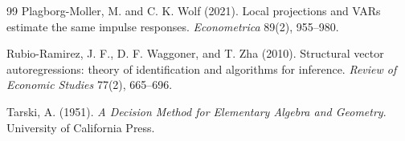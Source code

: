 \documentclass[11pt]{article}
\theoremstyle{definition}
\theoremstyle{plain}
\theoremstyle{remark}
\begin{document}
\begin{thebibliography}{99}
Plagborg-Moller, M. and C. K. Wolf (2021).  Local projections and VARs estimate the same impulse responses.  \emph{Econometrica} 89(2), 955--980.

Rubio-Ramirez, J. F., D. F. Waggoner, and T. Zha (2010).  Structural vector autoregressions: theory of identification and algorithms for inference.  \emph{Review of Economic Studies} 77(2), 665--696.

Tarski, A. (1951).  \emph{A Decision Method for Elementary Algebra and Geometry}.  University of California Press.
\end{thebibliography}
\end{document}
